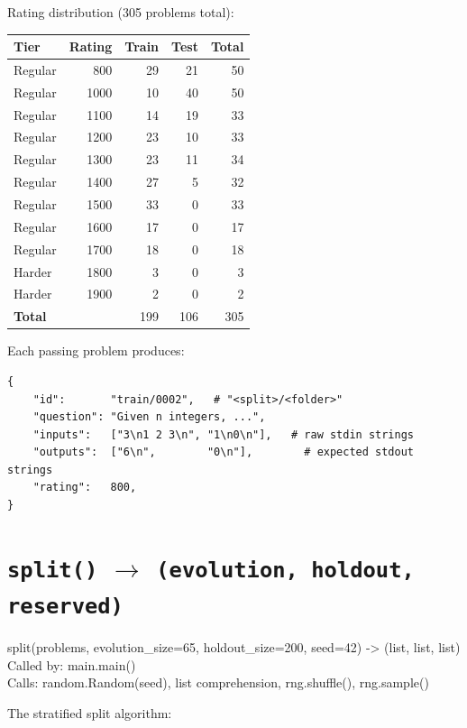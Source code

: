 \documentclass[11pt,a4paper]{report}
\newcommand{\fn}[1]{\texttt{#1}}
\begin{document}
Rating distribution (305 problems total):

\begin{center}
\begin{tabular}{@{}lrrrr@{}}
\toprule
\textbf{Tier} & \textbf{Rating} & \textbf{Train} & \textbf{Test} & \textbf{Total} \\
\midrule
Regular & 800  & 29 & 21 & 50 \\
Regular & 1000 & 10 & 40 & 50 \\
Regular & 1100 & 14 & 19 & 33 \\
Regular & 1200 & 23 & 10 & 33 \\
Regular & 1300 & 23 & 11 & 34 \\
Regular & 1400 & 27 &  5 & 32 \\
Regular & 1500 & 33 &  0 & 33 \\
Regular & 1600 & 17 &  0 & 17 \\
Regular & 1700 & 18 &  0 & 18 \\
Harder  & 1800 &  3 &  0 &  3 \\
Harder  & 1900 &  2 &  0 &  2 \\
\midrule
\textbf{Total} & & 199 & 106 & 305 \\
\bottomrule
\end{tabular}
\end{center}

Each passing problem produces:
\begin{lstlisting}[style=py]
{
    "id":       "train/0002",   # "<split>/<folder>"
    "question": "Given n integers, ...",
    "inputs":   ["3\n1 2 3\n", "1\n0\n"],   # raw stdin strings
    "outputs":  ["6\n",        "0\n"],        # expected stdout strings
    "rating":   800,
}
\end{lstlisting}

\section{\fn{split()} $\to$ \fn{(evolution, holdout, reserved)}}

\begin{spec}{split(problems, evolution\_size=65, holdout\_size=200, seed=42) -> (list, list, list)}
Called by: main.main() \\
Calls: random.Random(seed), list comprehension, rng.shuffle(), rng.sample()
\end{spec}

The stratified split algorithm:
\end{document}
